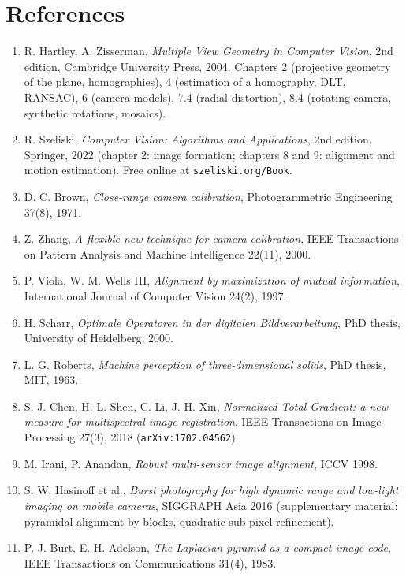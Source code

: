 \documentclass[a4paper,11pt]{report}
\begin{document}
\section{References}\label{sec:ann_references}
{\renewcommand{\labelenumi}{[\arabic{enumi}]}
\begin{enumerate}
	\item\label{ann_hz} R. Hartley, A. Zisserman, \emph{Multiple View Geometry in Computer Vision}, 2nd edition, Cambridge University Press, 2004. Chapters 2 (projective geometry of the plane, homographies), 4 (estimation of a homography, DLT, RANSAC), 6 (camera models), 7.4 (radial distortion), 8.4 (rotating camera, synthetic rotations, mosaics).
	\item\label{ann_szeliski} R. Szeliski, \emph{Computer Vision: Algorithms and Applications}, 2nd edition, Springer, 2022 (chapter 2: image formation; chapters 8 and 9: alignment and motion estimation). Free online at \texttt{szeliski.org/Book}.
	\item\label{ann_brown} D. C. Brown, \emph{Close-range camera calibration}, Photogrammetric Engineering 37(8), 1971.
	\item\label{ann_zhang} Z. Zhang, \emph{A flexible new technique for camera calibration}, IEEE Transactions on Pattern Analysis and Machine Intelligence 22(11), 2000.
	\item\label{ann_viola} P. Viola, W. M. Wells III, \emph{Alignment by maximization of mutual information}, International Journal of Computer Vision 24(2), 1997.
	\item\label{ann_scharr} H. Scharr, \emph{Optimale Operatoren in der digitalen Bildverarbeitung}, PhD thesis, University of Heidelberg, 2000.
	\item\label{ann_roberts} L. G. Roberts, \emph{Machine perception of three-dimensional solids}, PhD thesis, MIT, 1963.
	\item\label{ann_ntg} S.-J. Chen, H.-L. Shen, C. Li, J. H. Xin, \emph{Normalized Total Gradient: a new measure for multispectral image registration}, IEEE Transactions on Image Processing 27(3), 2018 (\texttt{arXiv:1702.04562}).
	\item\label{ann_irani} M. Irani, P. Anandan, \emph{Robust multi-sensor image alignment}, ICCV 1998.
	\item\label{ann_hasinoff} S. W. Hasinoff et al., \emph{Burst photography for high dynamic range and low-light imaging on mobile cameras}, SIGGRAPH Asia 2016 (supplementary material: pyramidal alignment by blocks, quadratic sub-pixel refinement).
	\item\label{ann_burt} P. J. Burt, E. H. Adelson, \emph{The Laplacian pyramid as a compact image code}, IEEE Transactions on Communications 31(4), 1983.

\end{enumerate}}
\end{document}
